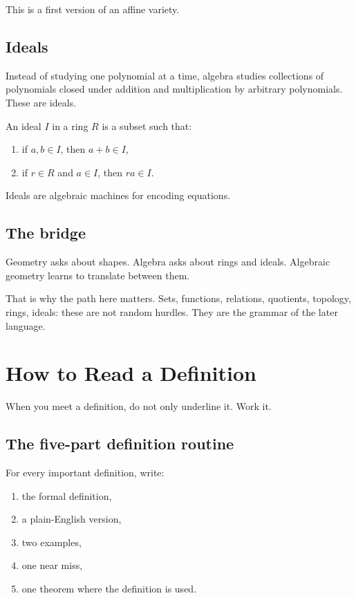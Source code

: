 \documentclass[11pt]{article}
\begin{document}
This is a first version of an affine variety.

\subsection{Ideals}

Instead of studying one polynomial at a time, algebra studies collections of polynomials closed under addition and multiplication by arbitrary polynomials. These are ideals.

\begin{definition}
An ideal $I$ in a ring $R$ is a subset such that:
\begin{enumerate}
\item if $a,b\in I$, then $a+b\in I$,
\item if $r\in R$ and $a\in I$, then $ra\in I$.
\end{enumerate}
\end{definition}

Ideals are algebraic machines for encoding equations.

\subsection{The bridge}

Geometry asks about shapes. Algebra asks about rings and ideals. Algebraic geometry learns to translate between them.

That is why the path here matters. Sets, functions, relations, quotients, topology, rings, ideals: these are not random hurdles. They are the grammar of the later language.

\newpage
\section{How to Read a Definition}

When you meet a definition, do not only underline it. Work it.

\subsection{The five-part definition routine}

For every important definition, write:

\begin{enumerate}
\item the formal definition,
\item a plain-English version,
\item two examples,
\item one near miss,
\item one theorem where the definition is used.
\end{enumerate}
\end{document}
